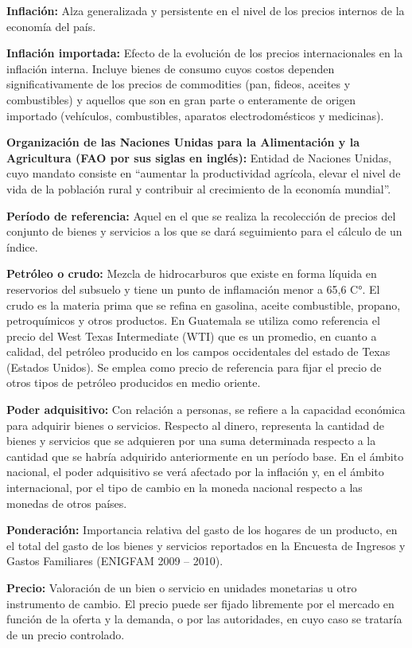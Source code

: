 \textbf{Inflación:} Alza generalizada y persistente en el nivel de los precios internos de la economía del país.

\textbf{Inflación importada:} Efecto de la evolución de los precios internacionales en la inflación interna. Incluye bienes de consumo cuyos costos dependen significativamente de los precios de commodities (pan, fideos, aceites y combustibles) y aquellos que son en gran parte o enteramente de origen importado (vehículos, combustibles, aparatos electrodomésticos y medicinas).

\textbf{Organización de las Naciones Unidas para la Alimentación y la Agricultura (FAO por sus siglas en inglés):} Entidad de Naciones Unidas, cuyo mandato consiste en “aumentar la productividad agrícola, elevar el nivel de vida de la población rural y contribuir al crecimiento de la economía mundial”.

\textbf{Período de referencia:} Aquel en el que se realiza la recolección de precios del conjunto de bienes y servicios a los que se dará seguimiento para el cálculo de un índice.

\textbf{Petróleo o crudo:} Mezcla de hidrocarburos que existe en forma líquida en reservorios del subsuelo y tiene un punto de inflamación menor a 65,6 C°. El crudo es la materia prima que se refina en gasolina, aceite combustible, propano, petroquímicos y otros productos. En Guatemala se utiliza como referencia el precio del West Texas Intermediate (WTI) que es un promedio, en cuanto a calidad, del petróleo producido en los campos occidentales del estado de Texas (Estados Unidos). Se emplea como precio de referencia para fijar el precio de otros tipos de petróleo producidos en medio oriente.

\textbf{Poder adquisitivo:} Con relación a personas, se refiere a la capacidad económica para adquirir bienes o servicios. Respecto al dinero, representa la cantidad de bienes y servicios que se adquieren por una suma determinada respecto a la cantidad que se habría adquirido anteriormente en un período base. En el ámbito nacional, el poder adquisitivo se verá afectado por la inflación y, en el ámbito internacional, por el tipo de cambio en la moneda nacional respecto a las monedas de otros países.

\textbf{Ponderación:} Importancia relativa del gasto de los hogares de un producto, en el total del gasto de los bienes y servicios reportados en la Encuesta de Ingresos y Gastos Familiares (ENIGFAM 2009 – 2010).

\textbf{Precio:} Valoración de un bien o servicio en unidades monetarias u otro instrumento de cambio. El precio puede ser fijado libremente por el mercado en función de la oferta y la demanda, o por las autoridades, en cuyo caso se trataría de un precio controlado.

